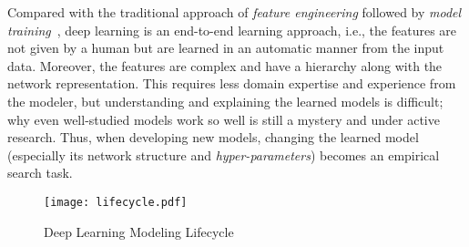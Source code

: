 \documentclass[conference]{IEEEtran}
\begin{document}
Compared with the traditional approach of {\em feature engineering} followed by {\em model training}~\cite{ce2014sigmod}, deep learning is an end-to-end learning approach, i.e., the features are not given by a human but are learned in an automatic manner from the input data. Moreover, the features are complex and have a hierarchy along with the network representation. 
This requires less domain expertise and experience from the modeler, but
understanding and explaining the learned models is difficult; why even well-studied models work so well is still a mystery and under active research. 
Thus, when developing new models, changing the learned model (especially its network structure and {\em hyper-parameters}) becomes an empirical search task. 




\begin{figure}[!t]
\centering
\texttt{[image: lifecycle.pdf]}
\caption{Deep Learning Modeling Lifecycle}
\label{fig:lifecycle}
\end{figure}
\end{document}

